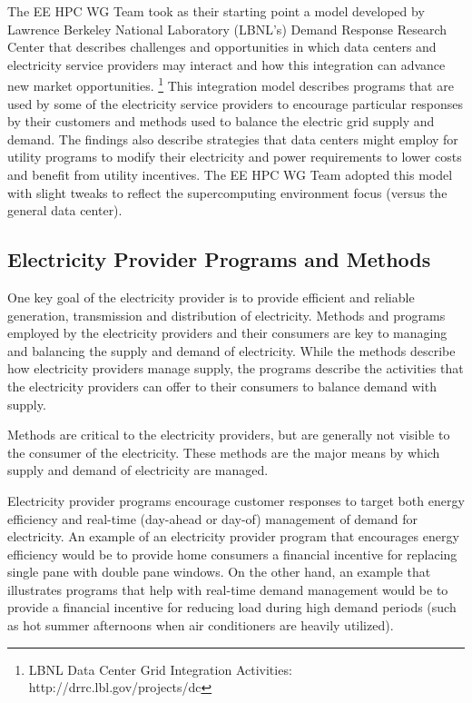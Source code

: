The EE HPC WG Team took as their starting point a model developed by 
Lawrence Berkeley National Laboratory (LBNL's) Demand Response Research Center
that describes challenges and opportunities in which data centers and electricity 
service providers may interact and how this integration can advance new market opportunities. \footnote{LBNL
Data Center Grid Integration Activities: http://drrc.lbl.gov/projects/dc} This integration model 
describes programs that are used by some of the electricity service providers to encourage particular 
responses by their customers and methods used to balance the electric grid supply and demand. 
The findings also describe strategies that data centers might employ for utility programs to modify 
their electricity and power requirements to lower costs and benefit from utility incentives. The EE HPC WG Team 
adopted this model with slight tweaks to reflect the supercomputing environment focus (versus the general data center).


\subsection{Electricity Provider Programs and Methods}

One key goal of the electricity provider is to provide efficient and reliable generation, transmission and 
distribution of electricity. Methods and programs employed by the electricity providers and their consumers 
are key to managing and balancing the supply and demand of electricity. While the methods describe how 
electricity providers manage supply, the programs describe the activities that the electricity providers 
can offer to their consumers to balance demand with supply.

Methods are critical to the electricity providers, but are generally not visible to the consumer of the electricity.  
These methods are the major means by which supply and demand of electricity are managed.

Electricity provider programs encourage customer responses to target both energy efficiency and real-time
(day-ahead or day-of) management of demand for electricity. An example of an electricity provider program 
that encourages energy efficiency would be to provide home consumers a financial incentive for replacing 
single pane with double pane windows.  On the other hand, an example that illustrates programs that help 
with real-time demand management would be to provide a financial incentive for reducing load during high demand periods 
(such as hot summer afternoons when air conditioners are heavily utilized). 

